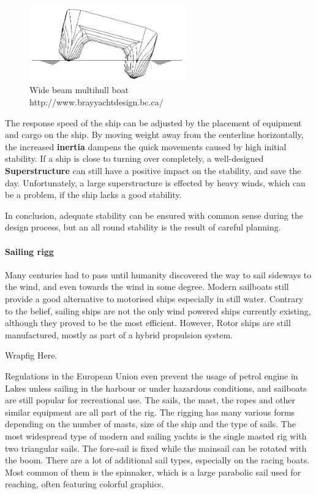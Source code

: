 \begin{figure}[H]
	\centering
	\includegraphics[width=0.6\textwidth]{img3/stability3}
	\caption{Wide beam multihull boat\\http://www.brayyachtdesign.bc.ca/}
	\label{fig:stability3}
\end{figure}

The response speed of the ship can be adjusted by the placement of equipment and cargo on the ship. By moving weight away from the centerline horizontally, the increased \textbf{inertia} dampens the quick movements caused by high initial stability. If a ship is close to turning over completely, a well-designed \textbf{Superstructure} can still have a positive impact on the stability, and save the day. Unfortunately, a large superstructure is effected by heavy winds, which can be a problem, if the ship lacks a good stability.

In conclusion, adequate stability can be ensured with common sense during the design process, but an all round stability is the result of careful planning.

\paragraph{Sailing rigg} 

Many centuries had to pass until humanity discovered the way to sail sideways to the wind, and even towards the wind in some degree. Modern sailboats still provide a good alternative to motorised ships especially in still water. Contrary to the belief, sailing ships are not the only wind powered ships currently existing, although they proved to be the most efficient. However, Rotor ships are still manufactured\cite[p. 47.]{future_propulsions}, mostly as part of a hybrid propulsion system.

Wrapfig Here.

Regulations in the European Union even prevent the usage of petrol engine in Lakes unless sailing in the harbour or under hazardous conditions, and sailboats are still popular for recreational use. The sails, the mast, the ropes and other similar equipment are all part of the rig. The rigging has many various forms depending on the number of masts, size of the ship and the type of sails. The most widespread type of modern and sailing yachts is the single masted rig with two triangular sails. The fore-sail  is fixed while the mainsail can be rotated with the boom. There are a lot of additional sail types, especially on the racing boats. Most common of them is the spinnaker, which is a large parabolic sail used for reaching, often featuring colorful graphics.

